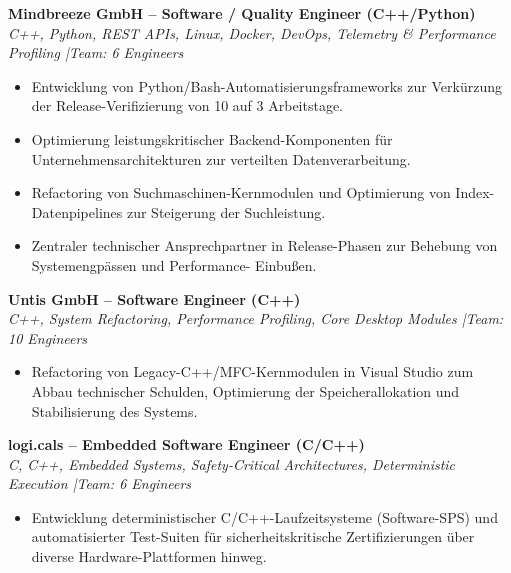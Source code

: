 \documentclass[10pt,a4paper]{article}
\begin{document}

\textbf{Mindbreeze GmbH -- Software / Quality Engineer (C++/Python)} \\
\textit{C++, Python, REST APIs, Linux, Docker, DevOps, Telemetry \& Performance Profiling \quad|\quad Team: 6 Engineers}
\begin{itemize}
    \item Entwicklung von Python/Bash-Automatisierungsframeworks zur Verkürzung der Release-Verifizierung von 10 auf 3 Arbeitstage.
    \item Optimierung leistungskritischer Backend-Komponenten für Unternehmensarchitekturen zur verteilten Datenverarbeitung.
    \item Refactoring von Suchmaschinen-Kernmodulen und Optimierung von Index-Datenpipelines zur Steigerung der Suchleistung.
    \item Zentraler technischer Ansprechpartner in Release-Phasen zur Behebung von Systemengpässen und Performance-
Einbußen.\end{itemize}

\vspace{0.15cm}
\textbf{Untis GmbH -- Software Engineer (C++)} \\
\textit{C++, System Refactoring, Performance Profiling, Core Desktop Modules \quad|\quad Team: 10 Engineers}
\begin{itemize}
    \item Refactoring von Legacy-C++/MFC-Kernmodulen in Visual Studio zum Abbau technischer Schulden, Optimierung der Speicherallokation und Stabilisierung des Systems.
\end{itemize}

\vspace{0.15cm}
\newpage
\textbf{logi.cals -- Embedded Software Engineer (C/C++)} \\
\textit{C, C++, Embedded Systems, Safety-Critical Architectures, Deterministic Execution \quad|\quad Team: 6 Engineers}
\begin{itemize}
    \item Entwicklung deterministischer C/C++-Laufzeitsysteme (Software-SPS) und automatisierter Test-Suiten für sicherheitskritische Zertifizierungen über diverse Hardware-Plattformen hinweg.
\end{itemize}
\end{document}
